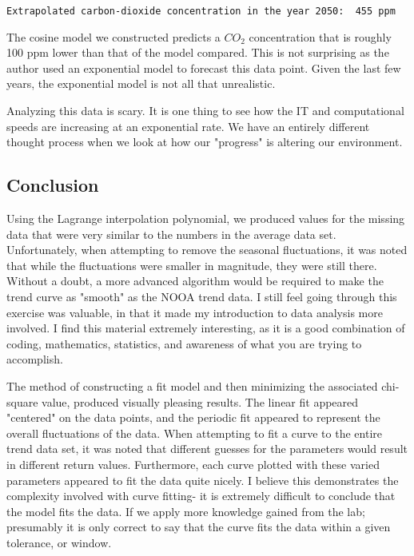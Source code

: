 \documentclass[11pt]{article}
\begin{document}
    \begin{Verbatim}[commandchars=\\\{\}]
Extrapolated carbon-dioxide concentration in the year 2050:  455 ppm

    \end{Verbatim}

    The cosine model we constructed predicts a \(CO_2\) concentration that
is roughly 100 ppm lower than that of the model compared. This is not
surprising as the author used an exponential model to forecast this data
point. Given the last few years, the exponential model is not all that
unrealistic.

Analyzing this data is scary. It is one thing to see how the IT and
computational speeds are increasing at an exponential rate. We have an
entirely different thought process when we look at how our "progress" is
altering our environment.

    \subsection{Conclusion}\label{conclusion}

Using the Lagrange interpolation polynomial, we produced values for the
missing data that were very similar to the numbers in the average data
set. Unfortunately, when attempting to remove the seasonal fluctuations,
it was noted that while the fluctuations were smaller in magnitude, they
were still there. Without a doubt, a more advanced algorithm would be
required to make the trend curve as "smooth" as the NOOA trend data. I
still feel going through this exercise was valuable, in that it made my
introduction to data analysis more involved. I find this material
extremely interesting, as it is a good combination of coding,
mathematics, statistics, and awareness of what you are trying to
accomplish.

The method of constructing a fit model and then minimizing the
associated chi-square value, produced visually pleasing results. The
linear fit appeared "centered" on the data points, and the periodic fit
appeared to represent the overall fluctuations of the data. When
attempting to fit a curve to the entire trend data set, it was noted
that different guesses for the parameters would result in different
return values. Furthermore, each curve plotted with these varied
parameters appeared to fit the data quite nicely. I believe this
demonstrates the complexity involved with curve fitting- it is extremely
difficult to conclude that the model fits the data. If we apply more
knowledge gained from the lab; presumably it is only correct to say that
the curve fits the data within a given tolerance, or window.
\end{document}
